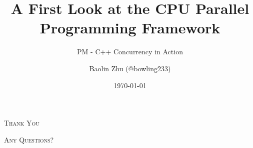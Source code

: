\documentclass{zjusct-beamer/zjusctbeamer}
\title{A First Look at the CPU Parallel Programming Framework}
\subtitle{PM - C++ Concurrency in Action}
\author[bowling233]{Baolin Zhu (@bowling233)}
\date{\today}
\institute[ZJUSCT]{Zhejiang University Supercomputing Team}
\begin{document}
\setmonofont{DejaVu Sans Mono}

\maketitle











\begin{frame}[standout]
	\Huge\textsc{Thank You}

	\vfill

	\LARGE\textsc{Any Questions?}
\end{frame}
\end{document}
